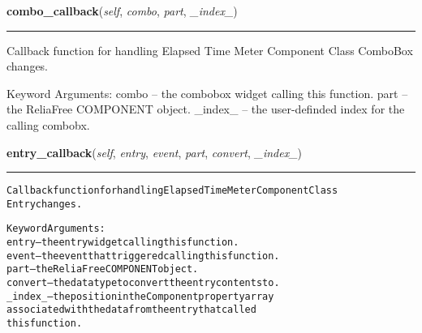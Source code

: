     \vspace{0.5ex}

\hspace{.8\funcindent}\begin{boxedminipage}{\funcwidth}

    \raggedright \textbf{combo\_callback}(\textit{self}, \textit{combo}, \textit{part}, \textit{\_index\_})

    \vspace{-1.5ex}

    \rule{\textwidth}{0.5\fboxrule}
\setlength{\parskip}{2ex}
    Callback function for handling Elapsed Time Meter Component Class 
    ComboBox changes.

    Keyword Arguments: combo   -- the combobox widget calling this 
    function. part    -- the ReliaFree COMPONENT object. \_index\_ -- the 
    user-definded index for the calling combobx.

\setlength{\parskip}{1ex}
    \end{boxedminipage}

    \label{reliafree:meters:meter:ElapsedTime:entry_callback}

    \vspace{0.5ex}

\hspace{.8\funcindent}\begin{boxedminipage}{\funcwidth}

    \raggedright \textbf{entry\_callback}(\textit{self}, \textit{entry}, \textit{event}, \textit{part}, \textit{convert}, \textit{\_index\_})

    \vspace{-1.5ex}

    \rule{\textwidth}{0.5\fboxrule}
\setlength{\parskip}{2ex}
\begin{alltt}
Callback function for handling Elapsed Time Meter Component Class
Entry changes.

Keyword Arguments:
entry   -- the entry widget calling this function.
event   -- the event that triggered calling this function.
part    -- the ReliaFree COMPONENT object.
convert -- the data type to convert the entry contents to.
\_index\_ -- the position in the Component property array
           associated with the data from the entry that called
           this function.
\end{alltt}

\setlength{\parskip}{1ex}
    \end{boxedminipage}

